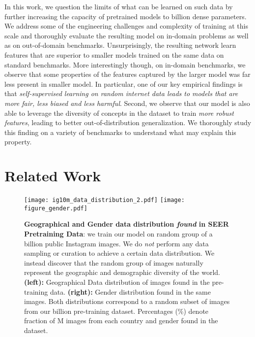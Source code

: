 \documentclass[10pt,twocolumn,letterpaper]{article}
\begin{document}
In this work, we question the limits of what can be learned on such data by further increasing the capacity of pretrained models to billion dense parameters.
We address some of the engineering challenges and complexity of training at this scale and thoroughly evaluate the resulting model on in-domain problems as well as on out-of-domain benchmarks.
Unsurprisingly, the resulting network learn features that are superior to smaller models trained on the same data on standard benchmarks.
More interestingly though, on in-domain benchmarks, we observe that some properties of the features captured by the larger model was far less present in smaller model.
In particular, one of our key empirical findings is that \emph{self-supervised learning on random internet data leads to models that are more fair, less biased and less harmful}.
Second, we observe that our model is also able to leverage the diversity of concepts in the dataset to train \emph{more robust features}, leading to better out-of-distribution generalization.
We thoroughly study this finding on a variety of benchmarks to understand what may explain this property. 






\section{Related Work}
\begin{figure*}[t]
  \centering
        \texttt{[image: ig10m\_data\_distribution\_2.pdf]}
       \hspace{0.5in}
  \texttt{[image: figure\_gender.pdf]}
  \caption{
  \label{fig:ig10m_data_distribution} \textbf{Geographical and Gender data distribution \textit{found} in SEER Pretraining Data}: we train our model on random group of a billion public Instagram images. We do \emph{not} perform any data sampling or curation to achieve a certain data distribution. We instead discover that the random group of images naturally represent the geographic and demographic diversity of the world.
    \textbf{(left):} Geographical Data distribution of images found in the pre-training data.
    \textbf{(right):} Gender distribution found in the same images.
Both distributions correspond to a random subset of  images from our  billion pre-training dataset. Percentages (\%) denote fraction of M images from each country and gender found in the dataset.
  }
\end{figure*}
\end{document}
